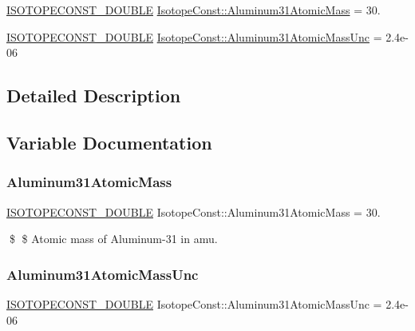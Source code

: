 \begin{DoxyCompactItemize}
\item 
\mbox{\hyperlink{group___isotope_const-_macros_ga8f45a7272ce02c0b4c65c44636ed719a}{I\+S\+O\+T\+O\+P\+E\+C\+O\+N\+S\+T\+\_\+\+D\+O\+U\+B\+LE}} \mbox{\hyperlink{group___isotope_const-_aluminum-_al31_ga3b9b03c3e680d63b9c935ea70350321a}{Isotope\+Const\+::\+Aluminum31\+Atomic\+Mass}} = 30.
\item 
\mbox{\hyperlink{group___isotope_const-_macros_ga8f45a7272ce02c0b4c65c44636ed719a}{I\+S\+O\+T\+O\+P\+E\+C\+O\+N\+S\+T\+\_\+\+D\+O\+U\+B\+LE}} \mbox{\hyperlink{group___isotope_const-_aluminum-_al31_gacece755c0005b7c98ec31fbace117aad}{Isotope\+Const\+::\+Aluminum31\+Atomic\+Mass\+Unc}} = 2.\+4e-\/06
\end{DoxyCompactItemize}


\subsection{Detailed Description}


\subsection{Variable Documentation}
\mbox{\label{group___isotope_const-_aluminum-_al31_ga3b9b03c3e680d63b9c935ea70350321a}} 
\subsubsection{\texorpdfstring{Aluminum31\+Atomic\+Mass}{Aluminum31AtomicMass}}
{\footnotesize\ttfamily \mbox{\hyperlink{group___isotope_const-_macros_ga8f45a7272ce02c0b4c65c44636ed719a}{I\+S\+O\+T\+O\+P\+E\+C\+O\+N\+S\+T\+\_\+\+D\+O\+U\+B\+LE}} Isotope\+Const\+::\+Aluminum31\+Atomic\+Mass = 30.}

\$ \$ Atomic mass of Aluminum-\/31 in amu. \mbox{\label{group___isotope_const-_aluminum-_al31_gacece755c0005b7c98ec31fbace117aad}} 
\subsubsection{\texorpdfstring{Aluminum31\+Atomic\+Mass\+Unc}{Aluminum31AtomicMassUnc}}
{\footnotesize\ttfamily \mbox{\hyperlink{group___isotope_const-_macros_ga8f45a7272ce02c0b4c65c44636ed719a}{I\+S\+O\+T\+O\+P\+E\+C\+O\+N\+S\+T\+\_\+\+D\+O\+U\+B\+LE}} Isotope\+Const\+::\+Aluminum31\+Atomic\+Mass\+Unc = 2.\+4e-\/06}

